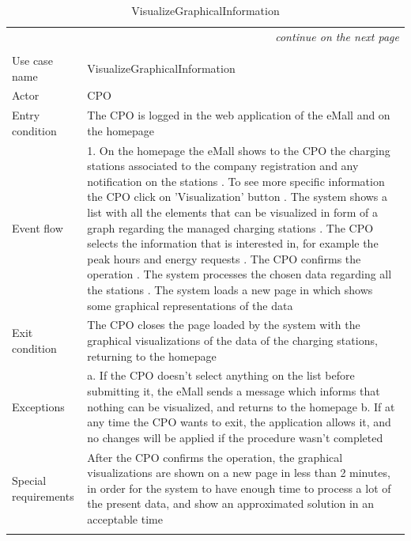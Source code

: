 \begin{center}
    \begin{longtable}{p{4cm} p{11cm}}
    \multicolumn{2}{r}{\itshape{continue on the next page}}\\
    \endfoot 
    \\
    \endlastfoot
    \hline
     Use case name &  VisualizeGraphicalInformation\\
     \hline
     Actor & CPO \\
     \hline
     Entry condition & The CPO is logged in the web application of the eMall and on the homepage \\
     \hline
     Event flow &   1. On the homepage the eMall shows to the CPO the charging stations associated to the company                   registration and any notification on the stations \newline
                    2. To see more specific information the CPO click on 'Visualization' button \newline 
                    3. The system shows a list with all the elements that can be visualized in form of a graph regarding the managed charging stations \newline
                    4. The CPO selects the information that is interested in, for example the peak hours and energy requests \newline
                    5. The CPO confirms the operation \newline
                    6. The system processes the chosen data regarding all the stations \newline
                    7. The system loads a new page in which shows some graphical representations of the data \\
     \hline
     Exit condition &  The CPO closes the page loaded by the system with the graphical visualizations of the data of the charging stations, returning to the homepage \\
     \hline
     Exceptions &   a. If the CPO doesn't select anything on the list before submitting it, the eMall sends a                       message which informs that nothing can be visualized, and returns to the homepage \newline
                    b. If at any time the CPO wants to exit, the application allows it, and no changes will be applied if the procedure wasn't completed \\
     \hline
     Special requirements & After the CPO confirms the operation, the graphical visualizations are shown on a new page in less than 2 minutes, in order for the system to have enough time to process a lot of the present data, and show an approximated solution in an acceptable time \\
     \hline
    \caption{VisualizeGraphicalInformation}
    \label{tab:VisualizeGraphicalInformation}
    \end{longtable}
\end{center}

